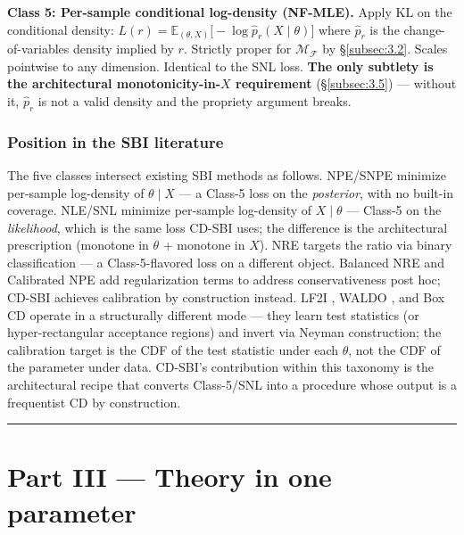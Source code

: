 \documentclass[11pt]{article}
\begin{document}
\textbf{Class 5: Per-sample conditional log-density (NF-MLE).} Apply KL
on the conditional density:
\(L(r) = \mathbb{E}_{(\theta, X)}\bigl[-\log \hat p_r(X \mid \theta)\bigr]\)
where \(\hat p_r\) is the change-of-variables density implied by \(r\).
Strictly proper for \(\mathcal{M}_\mathcal{F}\) by \S\ref{subsec:3.2}. Scales
pointwise to any dimension. Identical to the SNL loss. \textbf{The only
subtlety is the architectural monotonicity-in-\(X\) requirement} (\S\ref{subsec:3.5})
--- without it, \(\hat p_r\) is not a valid density and the propriety
argument breaks.

\subsubsection*{Position in the SBI literature}

The five classes intersect existing SBI methods as follows. NPE/SNPE
\citep{PapamakariosMurray2016, GreenbergEtAl2019} minimize per-sample
log-density of \(\theta \mid X\) --- a Class-5 loss on the
\emph{posterior}, with no built-in coverage. NLE/SNL
\citep{PapamakariosEtAl2019} minimize per-sample log-density of
\(X \mid \theta\) --- Class-5 on the \emph{likelihood}, which is the
same loss CD-SBI uses; the difference is the architectural prescription
(monotone in \(\theta\) + monotone in \(X\)). NRE
\citep{HermansEtAl2020} targets the ratio via binary classification ---
a Class-5-flavored loss on a different object. Balanced NRE
\citep{DelaunoyEtAl2022} and Calibrated NPE \citep{FalkiewiczEtAl2023}
add regularization terms to address conservativeness post hoc; CD-SBI
achieves calibration by construction instead. LF2I
\citep{DalmassoEtAl2024}, WALDO \citep{MasseranoEtAl2023}, and Box CD
\citep{BortolatoVentura2025} operate in a structurally different mode
--- they learn
test statistics (or hyper-rectangular acceptance regions) and invert via
Neyman construction; the calibration target is the CDF of the test
statistic under each \(\theta\), not the CDF of the parameter under
data. CD-SBI's contribution within this taxonomy is the architectural
recipe that converts Class-5/SNL into a procedure whose output is a
frequentist CD by construction.

\medskip\hrule\medskip

\section*{Part III — Theory in one parameter}
\end{document}
